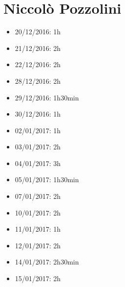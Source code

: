 \section{Niccolò Pozzolini}
\begin{itemize}
	\item 20/12/2016: 1h
	\item 21/12/2016: 2h
	\item 22/12/2016: 2h
	\item 28/12/2016: 2h
	\item 29/12/2016: 1h30min
	\item 30/12/2016: 1h
	\item 02/01/2017: 1h
	\item 03/01/2017: 2h
	\item 04/01/2017: 3h
	\item 05/01/2017: 1h30min
	\item 07/01/2017: 2h
	\item 10/01/2017: 2h
	\item 11/01/2017: 1h
	\item 12/01/2017: 2h
	\item 14/01/2017: 2h30min
	\item 15/01/2017: 2h
\end{itemize}